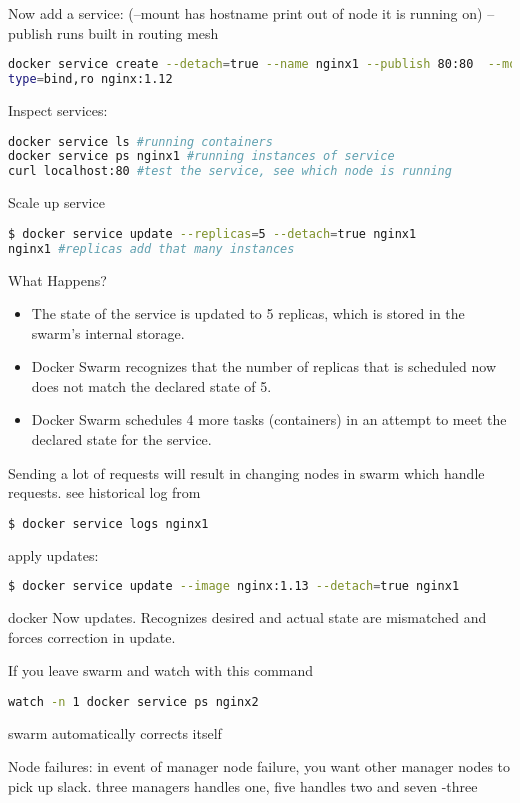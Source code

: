 \documentclass{article}
\begin{document}
   Now add a service: (--mount has hostname print out of node it is running on) --publish runs built in routing mesh
  \begin{lstlisting}[language=bash]
docker service create --detach=true --name nginx1 --publish 80:80  --mount source=/etc/hostname,target=/usr/share/nginx/html/index.html,
type=bind,ro nginx:1.12
   \end{lstlisting}
   Inspect services:
     \begin{lstlisting}[language=bash]
docker service ls #running containers
docker service ps nginx1 #running instances of service
curl localhost:80 #test the service, see which node is running
   \end{lstlisting}
  Scale up service  
    \begin{lstlisting}[language=bash]
  $ docker service update --replicas=5 --detach=true nginx1
nginx1 #replicas add that many instances
  \end{lstlisting}
  What Happens?
  \begin{itemize}
    \item The state of the service is updated to 5 replicas, which is stored in the swarm's internal storage.
    \item Docker Swarm recognizes that the number of replicas that is scheduled now does not match the declared state of 5.
    \item Docker Swarm schedules 4 more tasks (containers) in an attempt to meet the declared state for the service.
\end{itemize}
Sending a lot of requests will result in changing nodes in swarm which handle requests.
see historical log from 
\begin{lstlisting}[language=bash]
$ docker service logs nginx1
  \end{lstlisting}
  
apply updates: 
   \begin{lstlisting}[language=bash]
$ docker service update --image nginx:1.13 --detach=true nginx1
   \end{lstlisting}
   docker Now updates. Recognizes desired and actual state are mismatched and forces correction in update.
   
   If you leave swarm and watch
   with this command
      \begin{lstlisting}[language=bash]
   watch -n 1 docker service ps nginx2
     \end{lstlisting}
     swarm automatically corrects itself
     
     Node failures: in event of manager node failure, you want other manager nodes to pick up slack. 
     three managers handles one, five handles two and seven -three
   \begin{lstlisting}[language=bash]

   \end{lstlisting}
\end{document}
